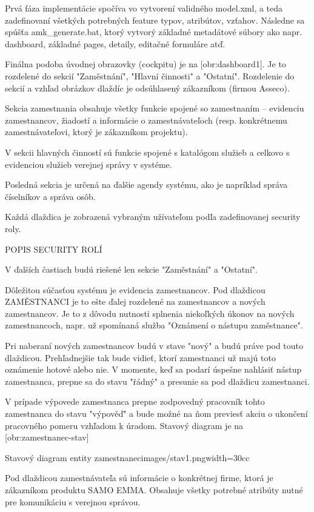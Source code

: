 Prvá fáza implementácie spočíva vo vytvorení validného model.xml, a teda zadefinovaní všetkých potrebných feature typov, atribútov, vzťahov. Následne sa spúšťa amk_generate.bat, ktorý vytvorý základné metadátové súbory ako napr. dashboard, základné pages, detaily, editačné formuláre atď.

Finálna podoba úvodnej obrazovky (cockpitu) je na [obr:dashboard1]. Je to rozdelené do sekcií "Zaměstnání", "Hlavní činnosti" a "Ostatní". Rozdelenie do sekcií a vzhľad obrázkov dlaždíc je odsúhlasený zákazníkom (firmou Asseco).

Sekcia zamestnania obsahuje všetky funkcie spojené so zamestnaním -- evidenciu zamestnancov, žiadostí a informácie o zamestnávateľoch (resp. konkrétnemu zamestnávateľovi, ktorý je zákazníkom projektu). 

V sekcii hlavných činností sú funkcie spojené s katalógom služieb a celkovo s evidenciou služieb verejnej správy v systéme. 

Posledná sekcia je určená na ďalšie agendy systému, ako je napríklad správa číselníkov a správa osôb.

Každá dlaždica je zobrazená vybraným užívateľom podľa zadefinovanej security roly. 

\TODO POPIS SECURITY ROLÍ

V ďalších častiach budú riešené len sekcie "Zaměstnání" a "Ostatní". 

Dôležitou súčasťou systému je evidencia zamestnancov. Pod dlaždicou \zlom ZAMĚSTNANCI je to ešte ďalej rozdelené na zamestnancov a nových zamestnancov. Je to z dôvodu nutnosti splnenia niekoľkých úkonov na nových zamestnancoch, napr. už spomínaná služba "Oznámení o nástupu zaměstnance". 

Pri naberaní nových zamestnancov budú v stave "nový" a budú práve pod touto dlaždicou. Prehľadnejšie tak bude vidieť, ktorí zamestnanci už majú toto oznámenie hotové alebo nie. V momente, keď sa podarí úspešne nahlásiť nástup zamestnanca, prepne sa do stavu "řádný" a presunie sa pod dlaždicu zamestnanci. 

V prípade výpovede zamestnanca prepne zodpovedný pracovník tohto zamestnanca do stavu "výpověď" a bude možné na ňom previesť akciu o ukončení pracovného pomeru vzhľadom k úradom. Stavový diagram je na [obr:zamestnanec-stav]

{Stavový diagram entity zamestnanec}{images/stav1.png}{width=30cc} 

Pod dlaždicou zamestnávateľa sú informácie o konkrétnej firme, ktorá je zákazníkom produktu SAMO EMMA. Obsahuje všetky potrebné atribúty nutné pre komunikáciu s verejnou správou.

